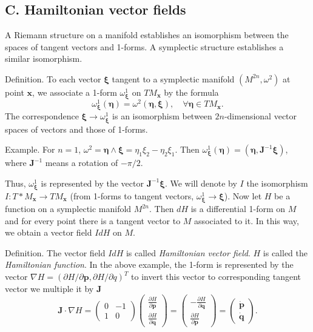 \documentclass{book}
\begin{document}
\subsection{C. Hamiltonian vector fields}



A Riemann structure on a manifold establishes an isomorphism between
the spaces of tangent vectors and 1-forms.
%
A symplectic structure establishes a similar isomorphism.


Definition.
%
To each vector $\pmb \xi$
tangent to a symplectic manifold $(M^{2n}, \omega^2)$
at point $\mathbf x$, we associate a 1-form $\omega^1_{\pmb \xi}$
on $TM_{\mathbf x}$ by the formula
$$
\omega^1_{\pmb \xi}(\pmb \eta) = \omega^2(\pmb \eta, \pmb \xi),
\quad \forall \pmb \eta \in TM_{\mathbf x}.
$$
%
The correspondence $\pmb \xi \rightarrow \omega^1_{\mathbf \xi}$
is an isomorphism between $2n$-dimensional vector spaces of vectors
and those of 1-forms.


Example.
%
For $n = 1$,
$\omega^2 = \pmb \eta \wedge \pmb \xi = \eta_1 \xi_2 - \eta_2 \xi_1$.
Then
$\omega^1_{\pmb \xi}(\pmb \eta) = (\pmb \eta, \mathbf J^{-1} \pmb \xi)$,
where $\mathbf J^{-1}$ means a rotation of $-\pi/2$.

Thus, $\omega^1_{\pmb \xi}$ is represented by the vector $\mathbf J^{-1} \pmb \xi$.
%
We will denote by $I$ the isomorphism
$I: T*M_{\mathbf x} \rightarrow TM_{\mathbf x}$
(from 1-forms to tangent vectors,
$\omega^1_{\pmb \xi} \rightarrow \pmb \xi$).
%
Now let $H$ be a function on a symplectic manifold $M^{2n}$.
%
Then $dH$ is a differential 1-form on $M$ and
for every point there is a tangent vector to $M$ associated to it.
%
In this way, we obtain a vector field $IdH$ on $M$.


Definition.
%
The vector field $IdH$ is called \emph{Hamiltonian vector field}.
%
$H$ is called the \emph{Hamiltonian function}.
%
In the above example,
the 1-form is represented by the vector
$\nabla H = (\partial H/\partial \mathbf p, \partial H/\partial q)^T$
to invert this vector to corresponding tangent vector we multiple it by $\mathbf J$
%
\[
\mathbf J \cdot \nabla H
=
\left(
  \begin{array}{ccc}
    0 & -1 \\
    1 & 0
  \end{array}
\right)
\left(
  \begin{array}{ccc}
    \frac{ \partial H }{ \partial \mathbf p } \\
    \frac{ \partial H }{ \partial \mathbf q }
  \end{array}
\right)
=
\left(
  \begin{array}{ccc}
    -\frac{ \partial H }{ \partial \mathbf q } \\
    \frac{ \partial H }{ \partial \mathbf p }
  \end{array}
\right)
=
\left(
  \begin{array}{ccc}
    \dot{\mathbf p} \\
    \dot{\mathbf q}
  \end{array}
\right).
\]
\end{document}
